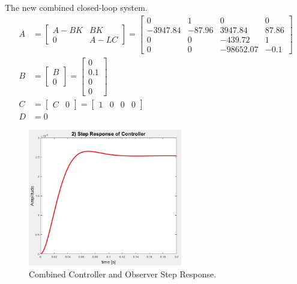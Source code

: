 \documentclass[11pt]{article}
\begin{document}
\begin{enumerate}[label=\textbf{\arabic*.}]
  The new combined closed-loop system.
  \begin{equation}
    \begin{split}
      A &= 
      \begin{bmatrix}
        A-BK & BK \\ 0 & A-LC
      \end{bmatrix}
      =
      \begin{bmatrix}
        0 & 1 & 0 & 0 \\
        -3947.84 & -87.96 & 3947.84 & 87.86 \\
        0 & 0 & -439.72 & 1 \\
        0 & 0 & -98652.07 & -0.1
      \end{bmatrix} \\
      B &=
      \begin{bmatrix}
        B \\ 0
      \end{bmatrix}
      =
      \begin{bmatrix}
        0 \\ 0.1 \\ 0 \\ 0
      \end{bmatrix} \\
      C &=
      \begin{bmatrix}
        C & 0
      \end{bmatrix}
      =
      \begin{bmatrix}
        1 & 0 & 0 & 0
      \end{bmatrix} \\
      D &= 0
    \end{split}
  \end{equation}
  \begin{figure}[H]
    \centering
    \includegraphics[width=0.6\textwidth]{p3.png}
    \caption{Combined Controller and Observer Step Response.}
  \end{figure}


\end{enumerate}
\end{document}
